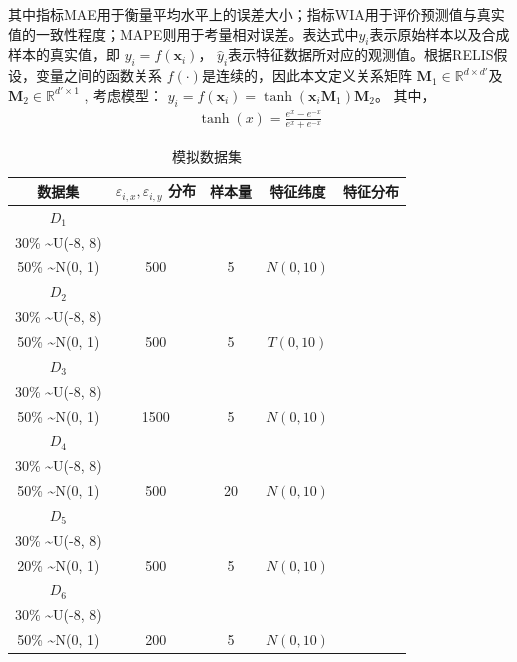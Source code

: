 \documentclass[12pt,a4paper]{article}%
\begin{document}
	其中指标MAE用于衡量平均水平上的误差大小；指标WIA用于评价预测值与真实值的一致性程度；MAPE则用于考量相对误差。表达式中$y_i$表示原始样本以及合成样本的真实值，即
	$y_i = f(\boldsymbol{x}_i)$， $\hat{y}_i$表示特征数据所对应的观测值。根据RELIS假设，变量之间的函数关系 $f(\cdot)$是连续的，因此本文定义关系矩阵 $\boldsymbol{M}_1\in\mathbb{R}^{d\times{d'}}$及$\boldsymbol{M}_2\in\mathbb{R}^{d'\times{1}}$ , 考虑模型：
	$y_i = f(\boldsymbol{x}_i) = \tanh(\boldsymbol{x}_i \boldsymbol{M}_1)\boldsymbol{M}_2$。
	其中，
	\begin{align}
		\tanh(x) = \frac{e^x - e^{-x}}{e^x + e^{-x}}
		\end{align}

		\begin{table}[ht]
			\centering
			\caption{模拟数据集}
			\begin{tabular}{ccccc}
			\toprule
			数据集 & \( \varepsilon_{i,x}, \varepsilon_{i,y} \) 分布 & 样本量 & 特征纬度 & 特征分布 \\
			\midrule
			\( D_1 \) & \( \begin{array}{l} 20\% \sim {N}(0, 64) \\ 30\% \sim {U}(-8, 8) \\ 50\% \sim {N}(0, 1) \end{array} \) & 500 & 5 & \( {N}(0, 10) \) \\
			\( D_2 \) & \( \begin{array}{l} 20\% \sim {N}(0, 64) \\ 30\% \sim {U}(-8, 8) \\ 50\% \sim {N}(0, 1) \end{array} \) & 500 & 5 & \( T(0, 10) \) \\
			\( D_3 \) & \( \begin{array}{l} 20\% \sim {N}(0, 64) \\ 30\% \sim {U}(-8, 8) \\ 50\% \sim {N}(0, 1) \end{array} \) & 1500 & 5 & \( {N}(0, 10) \) \\
			\( D_4 \) & \( \begin{array}{l} 20\% \sim {N}(0, 64) \\ 30\% \sim {U}(-8, 8) \\ 50\% \sim {N}(0, 1) \end{array} \) & 500 & 20 & \( {N}(0, 10) \) \\
			\( D_5 \) & \( \begin{array}{l} 50\% \sim {N}(0, 64) \\ 30\% \sim {U}(-8, 8) \\ 20\% \sim {N}(0, 1) \end{array} \) & 500 & 5 & \( {N}(0, 10) \) \\
			\( D_6 \) & \( \begin{array}{l} 20\% \sim {N}(0, 64) \\ 30\% \sim {U}(-8, 8) \\ 50\% \sim {N}(0, 1) \end{array} \) & 200 & 5 & \( {N}(0, 10) \) \\
			\bottomrule
			\end{tabular}
			\label{tab2}
		\end{table}
\end{document}
